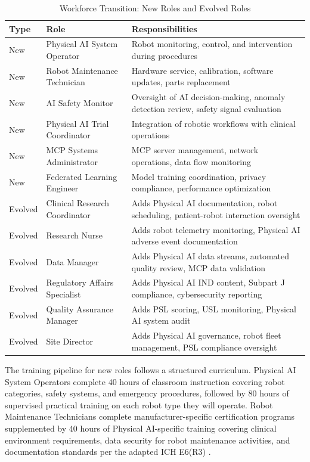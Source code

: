 \begin{table}[H]
\centering
\caption{Workforce Transition: New Roles and Evolved Roles}
\label{tab:workforce-roles}
\small
\begin{tabularx}{\textwidth}{l l X}
\toprule
\textbf{Type} & \textbf{Role} & \textbf{Responsibilities} \\
\midrule
New & Physical AI System Operator & Robot monitoring, control, and intervention during procedures \\
New & Robot Maintenance Technician & Hardware service, calibration, software updates, parts replacement \\
New & AI Safety Monitor & Oversight of AI decision-making, anomaly detection review, safety signal evaluation \\
New & Physical AI Trial Coordinator & Integration of robotic workflows with clinical operations \\
New & MCP Systems Administrator & MCP server management, network operations, data flow monitoring \\
New & Federated Learning Engineer & Model training coordination, privacy compliance, performance optimization \\
\midrule
Evolved & Clinical Research Coordinator & Adds Physical AI documentation, robot scheduling, patient-robot interaction oversight \\
Evolved & Research Nurse & Adds robot telemetry monitoring, Physical AI adverse event documentation \\
Evolved & Data Manager & Adds Physical AI data streams, automated quality review, MCP data validation \\
Evolved & Regulatory Affairs Specialist & Adds Physical AI IND content, Subpart J compliance, cybersecurity reporting \\
Evolved & Quality Assurance Manager & Adds PSL scoring, USL monitoring, Physical AI system audit \\
Evolved & Site Director & Adds Physical AI governance, robot fleet management, PSL compliance oversight \\
\bottomrule
\end{tabularx}
\end{table}

The training pipeline for new roles follows a structured curriculum. Physical AI
System Operators complete 40 hours of classroom instruction covering robot
categories, safety systems, and emergency procedures, followed by 80 hours of
supervised practical training on each robot type they will operate. Robot
Maintenance Technicians complete manufacturer-specific certification programs
supplemented by 40 hours of Physical AI-specific training covering clinical
environment requirements, data security for robot maintenance activities, and
documentation standards per the adapted ICH E6(R3) \cite{ich-adapt}.

